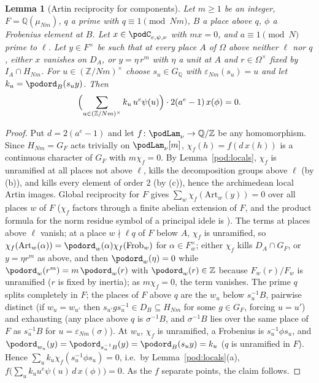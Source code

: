 \documentclass[10pt]{amsart}
\newtheorem{lemma}[theorem]{Lemma}
\theoremstyle{definition}
\theoremstyle{remark}
\newcommand{\Z}{\mathbb Z}
\newcommand{\Q}{\mathbb Q}
\begin{document}
\begin{lemma}[Artin reciprocity for components]\label{pod:artin}
Let $m\ge1$ be an integer, $F=\Q(\mu_{Nm})$, $q$ a prime
with $q\equiv1\pmod{Nm}$, $B$ a place above $q$, $\phi$ a Frobenius element at $B$. Let $x\in
\podC_{e,\psi,\nu}$ with $mx=0$, and $a\equiv1\pmod N$ prime to $\ell$. Let $y\in F^\times$ be such
that at every place $A$ of $\Omega$ above neither $\ell$ nor $q$, either $x$ vanishes on $D_A$, or
$y=\eta\,r^m$ with $\eta$ a unit at $A$ and $r\in\Omega^\times$ fixed by $I_A\cap H_{Nm}$. For $u\in
(\Z/Nm)^\times$ choose $s_u\in G_\Q$ with $\varepsilon_{Nm}(s_u)=u$ and let $k_u=\podord_B(s_uy)$.
Then
\[
\Bigl(\sum_{u\in(\Z/Nm)^\times}k_u\,u^e\psi(u)\Bigr)\cdot2(a^e-1)\,x(\phi)=0 .
\]
\end{lemma}
\begin{proof}
Put $d=2(a^e-1)$ and let $f\colon\podLam_\nu\to\Q/\Z$ be any homomorphism. Since $H_{Nm}=G_F$ acts
trivially on $\podLam_\nu[m]$, $\chi_f(h)=f(d\,x(h))$ is a continuous character of $G_F$ with $m\chi_f
=0$. By Lemma~\ref{pod:locals}, $\chi_f$ is unramified at all places not above $\ell$, kills the
decomposition groups above $\ell$ (by (b)), and kills every element of order $2$ (by (c)), hence the
archimedean local Artin images. Global reciprocity for $F$ gives $\sum_w\chi_f(\mathrm{Art}_w(y))=0$
over all places $w$ of $F$ ($\chi_f$ factors through a finite abelian extension of $F$, and the
product formula for the norm residue symbol of a principal idele is \cite[Chapter~VI, Corollary~(5.7)]{Neukirch}). The terms at places above $\ell$ vanish; at a place
$w\nmid\ell q$ of $F$ below $A$, $\chi_f$ is unramified, so $\chi_f(\mathrm{Art}_w(\alpha))=
\podord_w(\alpha)\chi_f(\mathrm{Frob}_w)$ for $\alpha\in F_w^\times$; either $\chi_f$ kills $D_A\cap
G_F$, or $y=\eta r^m$ as above, and then $\podord_w(\eta)=0$ while $\podord_w(r^m)=m\,\podord_w(r)$
with $\podord_w(r)\in\Z$ because $F_w(r)/F_w$ is unramified ($r$ is fixed by inertia); as $m\chi_f=0$,
the term vanishes. The prime $q$ splits
completely in $F$; the places of $F$ above $q$ are the $w_u$ below $s_u^{-1}B$, pairwise distinct
(if $w_u=w_{u'}$ then $s_{u'}gs_u^{-1}\in D_B\subseteq H_{Nm}$ for some $g\in G_F$, forcing
$u=u'$) and exhausting (any place above $q$ is $\sigma^{-1}B$, and $\sigma^{-1}B$ lies over the same
place of $F$ as $s_u^{-1}B$ for $u=\varepsilon_{Nm}(\sigma)$). At $w_u$, $\chi_f$ is unramified, a
Frobenius is $s_u^{-1}\phi s_u$, and $\podord_{w_u}(y)=\podord_{s_u^{-1}B}(y)=\podord_B(s_uy)=k_u$
($q$ is unramified in $F$). Hence $\sum_uk_u\chi_f(s_u^{-1}\phi s_u)=0$, i.e.\ by
Lemma~\ref{pod:locals}(a), $f\bigl(\sum_uk_uu^e\psi(u)\,d\,x(\phi)\bigr)=0$. As the $f$ separate points,
the claim follows.
\end{proof}
\end{document}
